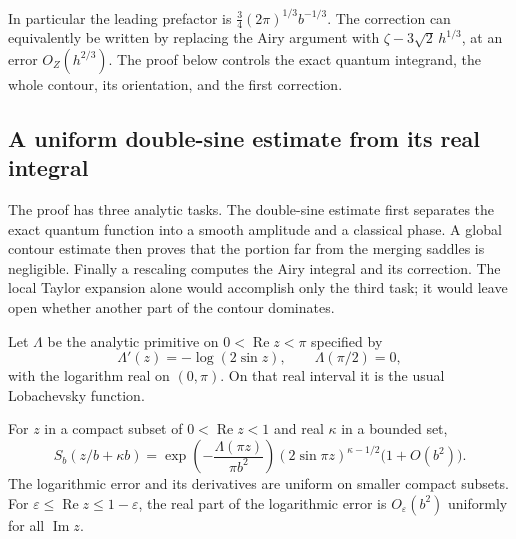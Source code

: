 In particular the leading prefactor is
$\frac34(2\pi)^{1/3}b^{-1/3}$. The correction can equivalently
be written by replacing the Airy argument with
$\zeta-3\sqrt2\,h^{1/3}$, at an error $O_Z(h^{2/3})$.
The proof below controls the exact quantum integrand, the whole
contour, its orientation, and the first correction.

\subsection{A uniform double-sine estimate from its real integral}

The proof has three analytic tasks. The double-sine estimate first
separates the exact quantum function into a smooth amplitude and a
classical phase. A global contour estimate then proves that the
portion far from the merging saddles is negligible. Finally a
rescaling computes the Airy integral and its correction. The local
Taylor expansion alone would accomplish only the third task;
it would leave open whether another part of the contour dominates.

Let $\Lambda$ be the analytic primitive on
$0<\operatorname{Re}z<\pi$ specified by
\[
 \Lambda'(z)=-\log(2\sin z),\qquad \Lambda(\pi/2)=0,
\]
with the logarithm real on $(0,\pi)$. On that real interval it is
the usual Lobachevsky function.

\begin{lemma}
\label{lem:stripdoubleSine}
For $z$ in a compact subset of $0<\operatorname{Re}z<1$ and
real $\kappa$ in a bounded set,
\begin{equation}
 S_b(z/b+\kappa b)
 =
 \exp\!\left(-\frac{\Lambda(\pi z)}{\pi b^2}\right)
 (2\sin\pi z)^{\kappa-1/2}
 \bigl(1+O(b^2)\bigr).
 \label{eq:uniformstripSb}
\end{equation}
The logarithmic error and its derivatives are uniform on
smaller compact subsets. For
$\varepsilon\le\operatorname{Re}z\le1-\varepsilon$,
the real part of the logarithmic error is $O_\varepsilon(b^2)$
uniformly for all $\operatorname{Im}z$.
\end{lemma}

